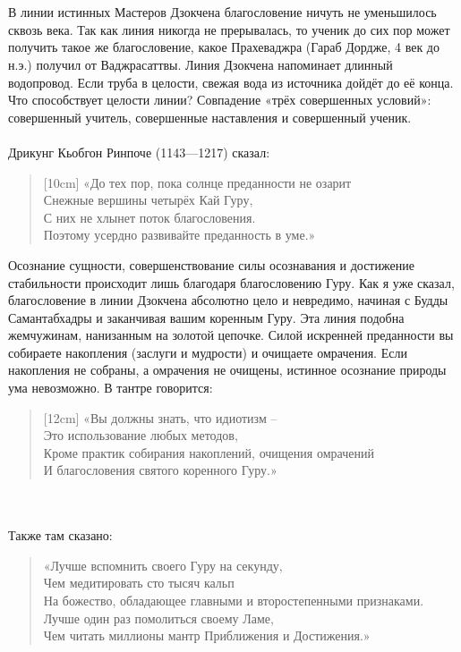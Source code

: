 \newpage
\\ \\ В линии истинных Мастеров Дзокчена благословение ничуть не уменьшилось сквозь века. Так как линия никогда не прерывалась, то ученик до сих пор может получить такое же благословение, какое Прахеваджра (Гараб Дордже, 4 век до н.э.) получил от Ваджрасаттвы. Линия Дзокчена напоминает длинный водопровод. Если труба в целости, свежая вода из источника дойдёт до её конца. Что способствует целости линии? Совпадение «трёх совершенных условий»: совершенный учитель, совершенные наставления и совершенный ученик.
\\ \\ Дрикунг Кьобгон Ринпоче (1143—1217) сказал:
\begin{verse}[10cm]
«До тех пор, пока солнце преданности не озарит 
\\ Снежные вершины четырёх Кай Гуру, 
\\ С них не хлынет поток благословения. 
\\ Поэтому усердно развивайте преданность в уме.»
\end{verse}
Осознание сущности, совершенствование силы осознавания и достижение стабильности происходит лишь благодаря благословению Гуру. Как я уже сказал, благословение в линии Дзокчена абсолютно цело и невредимо, начиная с Будды Самантабхадры и заканчивая вашим коренным Гуру. Эта линия подобна жемчужинам, нанизанным на золотой цепочке. Силой искренней преданности вы собираете накопления (заслуги и мудрости) и очищаете омрачения. Если накопления не собраны, а омрачения не очищены, истинное осознание приро\-ды ума невозможно. В тантре говорится:
\begin{verse}[12cm]
«Вы должны знать, что идиотизм –
\\ Это использование любых методов,
\\ Кроме практик собирания накоплений, очищения омрачений
\\ И благословения святого коренного Гуру.»
\end{verse}
\\ \\ Также там сказано:
\begin{verse}
«Лучше вспомнить своего Гуру на секунду, 
\\ Чем медитировать сто тысяч кальп
\\ На божество, обладающее главными и второстепенными признаками. 
\\ Лучше один раз помолиться своему Ламе, 
\\ Чем читать миллионы мантр Приближения и Достижения.»
\end{verse}
